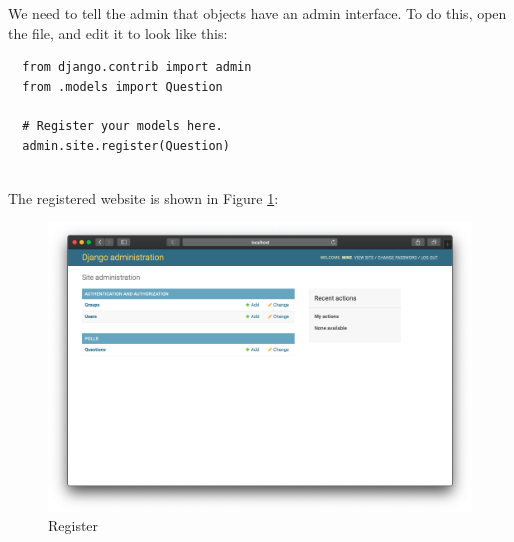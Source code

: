 We need to tell the admin that  objects have an admin interface.
To do this, open the  file, and edit it to look like this:

\lstset{language=Python}
\begin{lstlisting}
  from django.contrib import admin
  from .models import Question

  # Register your models here.
  admin.site.register(Question)
  
\end{lstlisting}

The registered website is shown in Figure \ref{fig:register}:
\begin{figure}[!ht]
  \centering
  \includegraphics[width=\textwidth]{regist.png}
  \caption{Register}
  \label{fig:register}
\end{figure}


